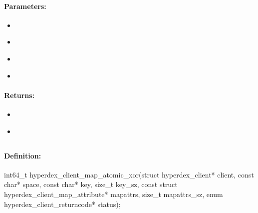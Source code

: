 \paragraph{Parameters:}
\begin{itemize}[noitemsep]
\item {}\\

\item {}\\

\item {}\\

\item {}\\

\end{itemize}

\paragraph{Returns:}
\begin{itemize}[noitemsep]
\item {}\\

\item {}\\

\end{itemize}

\pagebreak
\subsection{}
\label{api:c:map_atomic_xor}


\paragraph{Definition:}
\begin{ccode}
int64_t hyperdex_client_map_atomic_xor(struct hyperdex_client* client,
        const char* space,
        const char* key, size_t key_sz,
        const struct hyperdex_client_map_attribute* mapattrs, size_t mapattrs_sz,
        enum hyperdex_client_returncode* status);
\end{ccode}

